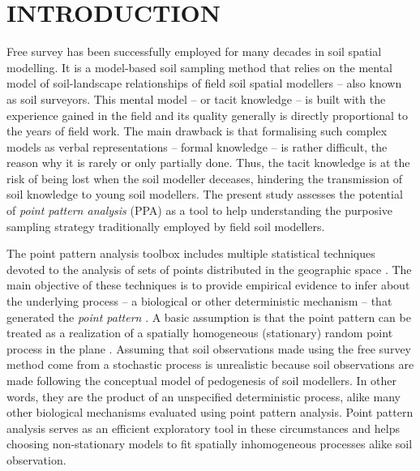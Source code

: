 \formatchapter

\section{INTRODUCTION}

Free survey has been successfully employed for many decades in soil spatial modelling. It is a model-based 
soil sampling method that relies on the mental model of soil-landscape relationships of field soil spatial 
modellers -- also known as soil surveyors. This mental model -- or tacit knowledge -- is built with the 
experience gained in the field and its quality generally is directly proportional to the years of field work. 
The main drawback is that formalising such complex models as verbal representations -- formal knowledge -- is 
rather difficult, the reason why it is rarely or only partially done. Thus, the tacit knowledge is at the risk 
of being lost when the soil modeller deceases, hindering the transmission of soil knowledge to young soil 
modellers. The present study assesses the potential of \emph{point pattern analysis} (PPA) as a tool to help 
understanding the purposive sampling strategy traditionally employed by field soil modellers.

The point pattern analysis toolbox includes multiple statistical techniques devoted to the analysis of sets of 
points distributed in the geographic space \cite{Diggle2003}. The main objective of these techniques is to 
provide empirical evidence to infer about the underlying process -- a biological or other deterministic 
mechanism -- that generated the \emph{point pattern} \cite{BivandEtAl2008}. A basic assumption is that the 
point pattern can be treated as a realization of a spatially homogeneous (stationary) random point process in 
the plane \cite{Diggle2003}. Assuming that soil observations made using the free survey method come from a 
stochastic process is unrealistic because soil observations are made following the conceptual model of 
pedogenesis of soil modellers. In other words, they are the product of an unspecified deterministic process, 
alike many other biological mechanisms evaluated using point pattern analysis. Point pattern analysis serves 
as an efficient exploratory tool in these circumstances and helps choosing non-stationary models to fit 
spatially inhomogeneous processes \cite{Baddeley2010} alike soil observation.

